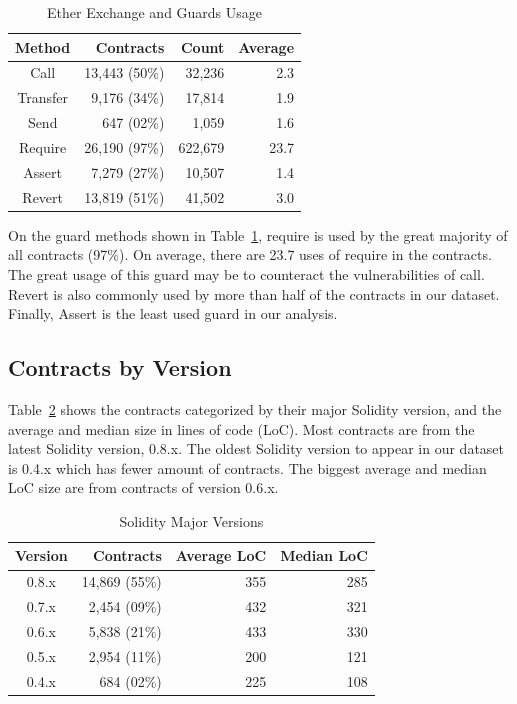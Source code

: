 \documentclass[10pt,conference]{IEEEtran}
\begin{document}
\begin{table}
\center
  \caption{Ether Exchange and Guards Usage}
  \label{tab:results-all}
  \begin{tabular}{crrr}
    \hline
    Method & Contracts & Count & Average \\
    \hline
    Call & 13,443 (50\%) & 32,236 & 2.3 \\
    Transfer & 9,176 (34\%) & 17,814 & 1.9 \\
    Send & 647 (02\%) & 1,059& 1.6 \\
    Require & 26,190 (97\%) & 622,679 & 23.7 \\
    Assert & 7,279 (27\%) & 10,507 & 1.4 \\
    Revert & 13,819 (51\%) & 41,502 & 3.0\\
    \hline
\end{tabular}
\end{table}

On the guard methods shown in Table~\ref{tab:results-all}, require is used by the great majority of all contracts (97\%). On average, there are 23.7 uses of require in the contracts. The great usage of this guard may be to counteract the vulnerabilities of call. Revert is also commonly used by more than half of the contracts in our dataset. Finally, Assert is the least used guard in our analysis.

\subsection{Contracts by Version}

Table~\ref{tab:major-versions} shows the contracts categorized by their major Solidity version, and the average and median size in lines of code (LoC). Most contracts are from the latest Solidity version, 0.8.x. The oldest Solidity version to appear in our dataset is 0.4.x which has fewer amount of contracts. The biggest average and median LoC size are from contracts of version 0.6.x.

\begin{table}
\center
  \caption{Solidity Major Versions}
  \label{tab:major-versions}
  \begin{tabular}{crrr}
    \hline
    Version & Contracts & Average LoC & Median LoC \\
    \hline
    0.8.x & 14,869 (55\%) & 355 & 285 \\
    0.7.x & 2,454 (09\%) & 432 & 321 \\
    0.6.x & 5,838 (21\%) & 433 & 330 \\
    0.5.x & 2,954 (11\%) & 200 & 121 \\
    0.4.x & 684  (02\%) & 225 & 108 \\
  \hline
\end{tabular}
\end{table}
\end{document}
